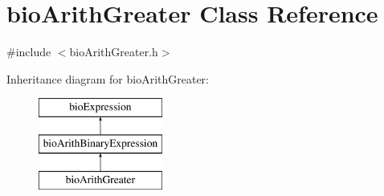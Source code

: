 \hypertarget{classbio_arith_greater}{}\section{bio\+Arith\+Greater Class Reference}
\label{classbio_arith_greater}


{\ttfamily \#include $<$bio\+Arith\+Greater.\+h$>$}

Inheritance diagram for bio\+Arith\+Greater\+:\begin{figure}[H]
\begin{center}
\leavevmode
\includegraphics[height=3.000000cm]{classbio_arith_greater}
\end{center}
\end{figure}
